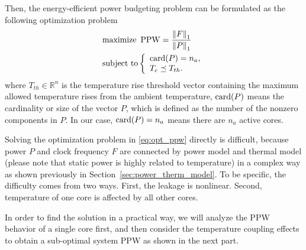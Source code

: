 Then, the energy-efficient power budgeting problem can be formulated as the following optimization problem
\begin{equation}\label{eq:opt_ppw}
\begin{split}
&\text{maximize}~ \ppw = \frac{\left \| F \right \|_{1}}{\left \| P \right \|_{1}}\\
&\text{subject to}  \left\{
\begin{array}{lr}
\card(P) = n_{a},\\
T_{c} \preceq T_{th}.\\
\end{array}
\right.
\end{split}
\end{equation}
where $T_{th} \in \mathbb{R}^{n}$ is the temperature rise threshold
vector containing the maximum allowed temperature rises from the
ambient temperature, $\operatorname{card}(P)$ means the cardinality or size of the vector $P$, which is defined as the number of the nonzero components in $P$. In our case, $\operatorname{card}(P) = n_{a}$ means there are $n_{a}$ active cores.


Solving the optimization problem in \eqref{eq:opt_ppw} directly is
difficult, because power $P$ and clock frequency $F$ are connected by
power model and thermal model (please note that static power is highly
related to temperature) in a complex way as shown previously in
Section~\ref{sec:power_therm_model}. To be specific, the difficulty
comes from two ways. First, the leakage is nonlinear. Second,
temperature of one core is affected by all other cores. 

In order to find the solution in a practical way, we will analyze the PPW
behavior of a single core first, and then consider the temperature coupling
effects to obtain a sub-optimal system PPW as shown in the next part.



